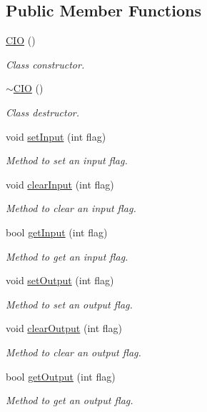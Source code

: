 \subsection*{Public Member Functions}
\begin{DoxyCompactItemize}
\item 
\mbox{\label{class_c_i_o_a3359eaeb579531915933aa67d2fb02fd}} 
\mbox{\hyperlink{class_c_i_o_a3359eaeb579531915933aa67d2fb02fd}{C\+IO}} ()
\begin{DoxyCompactList}\small\item\em Class constructor. \end{DoxyCompactList}\item 
\mbox{\label{class_c_i_o_ae35aa920244299f614fbc9c7d1edc4de}} 
\mbox{\hyperlink{class_c_i_o_ae35aa920244299f614fbc9c7d1edc4de}{$\sim$\+C\+IO}} ()
\begin{DoxyCompactList}\small\item\em Class destructor. \end{DoxyCompactList}\item 
void \mbox{\hyperlink{class_c_i_o_ac61124eef35d5b751783010b39b24b0d}{set\+Input}} (int flag)
\begin{DoxyCompactList}\small\item\em Method to set an input flag. \end{DoxyCompactList}\item 
void \mbox{\hyperlink{class_c_i_o_a5fddf5dbe86f9baac7e2c75dcd9d35e6}{clear\+Input}} (int flag)
\begin{DoxyCompactList}\small\item\em Method to clear an input flag. \end{DoxyCompactList}\item 
bool \mbox{\hyperlink{class_c_i_o_aa87a99ef2b17c9243a745a6ec90fc5ef}{get\+Input}} (int flag)
\begin{DoxyCompactList}\small\item\em Method to get an input flag. \end{DoxyCompactList}\item 
void \mbox{\hyperlink{class_c_i_o_afc99e1a01c6de3f5f6126db69f8fd00e}{set\+Output}} (int flag)
\begin{DoxyCompactList}\small\item\em Method to set an output flag. \end{DoxyCompactList}\item 
void \mbox{\hyperlink{class_c_i_o_aa37612a9e9adfce7bf9b3a943bf961de}{clear\+Output}} (int flag)
\begin{DoxyCompactList}\small\item\em Method to clear an output flag. \end{DoxyCompactList}\item 
bool \mbox{\hyperlink{class_c_i_o_acc87c3bab69009087ff8cbc09dff88a3}{get\+Output}} (int flag)
\begin{DoxyCompactList}\small\item\em Method to get an output flag. \end{DoxyCompactList}\end{DoxyCompactItemize}



